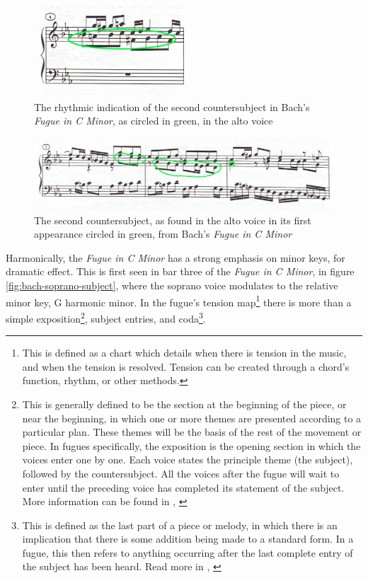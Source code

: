 \begin{figure}
    \centering
    \includegraphics[width=0.5\textwidth]{figures/bach-fugue-second-cs-indication.png}
    \caption{The rhythmic indication of the second countersubject in Bach's \textit{Fugue in C Minor}, as circled in green, in the alto voice}
    \label{fig:bach-fugue-second-cs-indication}
\end{figure}

\begin{figure}
    \centering
    \includegraphics[width=\textwidth]{figures/bach-fugue-second-countersubject.png}
    \caption{The second countersubject, as found in the alto voice in its first appearance circled in green, from Bach's \textit{Fugue in C Minor}}
    \label{fig:bach-fugue-second-countersubject}
\end{figure}

Harmonically, the \textit{Fugue in C Minor} has a strong emphasis on minor keys, for dramatic effect. This is first seen in bar three of the \textit{Fugue in C Minor}, in figure \ref{fig:bach-soprano-subject}\autocite{Henle_2009}, where the soprano voice modulates to the relative minor key, G harmonic minor. In the fugue's tension map\footnote{This is defined as a chart which details when there is tension in the music, and when the tension is resolved. Tension can be created through a chord's function, rhythm, or other methods.} there is more than a simple exposition\footnote{This is generally defined to be the section at the beginning of the piece, or near the beginning, in which one or more themes are presented according to a particular plan. These themes will be the basis of the rest of the movement or piece. In fugues specifically, the exposition is the opening section in which the voices enter one by one. Each voice states the principle theme (the subject), followed by the countersubject. All the voices after the fugue will wait to enter until the preceding voice has completed its statement of the subject. More information can be found in \citeauthor{Walker_2001_Exposition}, \citeyear{Walker_2001_Exposition}}, subject entries, and coda\footnote{This is defined as the last part of a piece or melody, in which there is an implication that there is some addition being made to a standard form. In a fugue, this then refers to anything occurring after the last complete entry of the subject has been heard. Read more in \citeauthor{Bullivant_2001}, \citeyear{Bullivant_2001}}. 